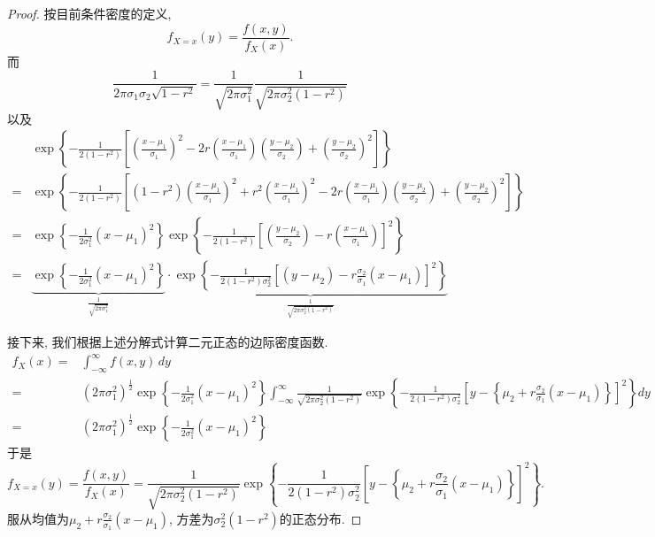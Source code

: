 \documentclass[UTF8, a4paper]{article}
\begin{document}
\begin{proof}
按目前条件密度的定义, 
$$
f_{X = x}(y) = \frac{f(x, y)}{f_X(x)}.
$$
而
$$
\frac{1}{2\pi\sigma_1\sigma_2 \sqrt{1 - r^2}} = \frac{1}{\sqrt{2\pi\sigma_1^2}} \frac{1}{\sqrt{2\pi \sigma_2^2(1 - r^2)}}
$$
以及
$$
\begin{aligned}
&\exp\left\{-\frac{1}{2(1 - r^2)}\left[\left(\frac{x - \mu_1}{\sigma_1}\right)^2 - 2r \left(\frac{x - \mu_1}{\sigma_1}\right)\left(\frac{y - \mu_2}{\sigma_2}\right) + \left(\frac{y - \mu_2}{\sigma_2}\right)^2\right]\right\} \\
=&\exp \left\{ - \frac{1}{2(1 - r^2)}\left[(1-r^2)\left(\frac{x - \mu_1}{\sigma_1}\right)^2 + r^2 \left(\frac{x - \mu_1}{\sigma_1}\right)^2 - 2r\left(\frac{x - \mu_1}{\sigma_1}\right)\left(\frac{y - \mu_2}{\sigma_2}\right) + \left(\frac{y - \mu_2}{\sigma_2}\right)^2\right]\right\} \\
=& \exp\left\{-\frac{1}{2\sigma_1^2}(x - \mu_1)^2\right\} \exp\left\{-\frac{1}{2(1 - r^2)}\left[\left(\frac{y - \mu_2}{\sigma_2} \right)- r \left(\frac{x - \mu_1}{\sigma_1}\right)\right]^2\right\} \\
=& \underset{ \frac{1}{\sqrt{2\pi\sigma_1^2}} }{\underbrace{\exp\left\{-\frac{1}{2\sigma_1^2}(x - \mu_1)^2\right\}}} \cdot \underset{\frac{1}{\sqrt{2\pi \sigma_2^2(1 - r^2)}}}{\underbrace{\exp\left\{-\frac{1}{2(1 - r^2)\sigma_2^2}\left[\left({y - \mu_2} \right)- r \frac{\sigma_2}{\sigma_1}\left({x - \mu_1}\right)\right]^2\right\}}}
\end{aligned}
$$

接下来, 我们根据上述分解式计算二元正态的边际密度函数.
$$
\begin{aligned}
    f_X(x) =& \int_{-\infty}^{\infty} f(x, y) \, dy  \\
    =& (2\pi\sigma_1^2)^{\frac{1}{2}}\exp\left\{-\frac{1}{2\sigma_1^2}(x - \mu_1)^2\right\} \int_{-\infty}^{\infty}\frac{1}{\sqrt{2\pi \sigma_2^2(1 - r^2)}} \exp\left\{-\frac{1}{2(1 - r^2)\sigma_2^2}\left[y - \left\{\mu_2 + r \frac{\sigma_2}{\sigma_1}\left({x - \mu_1}\right)\right\}\right]^2\right\} dy \\
    =& (2\pi\sigma_1^2)^{\frac{1}{2}}\exp\left\{-\frac{1}{2\sigma_1^2}(x - \mu_1)^2\right\} 
\end{aligned}
$$
于是
$$
f_{X = x}(y) = \frac{f(x, y)}{f_X(x)} = \frac{1}{\sqrt{2\pi \sigma_2^2(1 - r^2)}} \exp\left\{-\frac{1}{2(1 - r^2)\sigma_2^2}\left[y - \left\{\mu_2 + r \frac{\sigma_2}{\sigma_1}\left({x - \mu_1}\right)\right\}\right]^2\right\}.
$$
服从均值为\(\mu_2 + r \frac{\sigma_2}{\sigma_1}\left({x - \mu_1}\right)\), 方差为\(\sigma_2^2(1 - r^2)\)的正态分布.
\end{proof}
\end{document}

